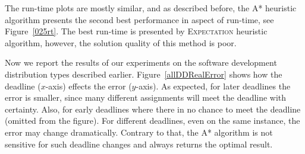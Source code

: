 \documentclass[letterpaper]{article} %
\newcommand{\commentout}[1]{}
\newcommand{\astar}{\textsc{A*}\xspace}
\newcommand{\sampling}{\textsc{Sampling}\xspace}
\newcommand{\expectation}{\textsc{Expectation}\xspace}
\begin{document}
The run-time plots are mostly similar, and as described before, the \astar heuristic algorithm presents the second best performance in aspect of run-time, see Figure~\ref{025rt}.
The best run-time is presented by \expectation heuristic algorithm, however, the solution quality of this method is poor.


\commentout{
\begin{figure}[h!]
	\scriptsize
	\begin{tikzpicture}
	\begin{axis}[
	scale=0.7,
	ymode = log,
	xlabel={\#Layers},
	ylabel near ticks,
	ylabel={Runtime (sec)},
	xmin=4, xmax=8,
	ymin=0, ymax=452,
	legend pos=outer north east,
	ymajorgrids=true,
	grid style=dashed,
	]

	\addplot[
	color=blue,
	mark=x,
	]
	coordinates {
		(4 , 0.08)
		(5 , 0.7)
		(6 , 6.16)
		(7 , 47.67)
		(8 , 452)

	};
	\addlegendentry{BF}

	\addplot[
	color=gray,
	mark=x,
	]
	coordinates {
		(4 , 0.11)
		(5 , 0.25)
		(6 , 0.8)
		(7 , 3.1)
		(8 , 16.1)

	};
	\addlegendentry{\astar}


		\addplot[
	color=green,
	mark=o,
	]
	coordinates {
		(4 , 0.13)
		(5 , 0.53)
		(6 , 2.37)
		(7 , 9)
		(8 , 43)

	};
	\addlegendentry{\sampling}

	\addplot[
	color=red,
	mark=square,
	]
	coordinates {
		(4 , 0.001)
		(5 , 0.005)
		(6 , 0.02)
		(7 , 0.09)
		(8 , 0.4)

	};
	\addlegendentry{\expectation}

	\end{axis}
	\end{tikzpicture}
	\caption{Run time comparison of all heuristic algorithms for deadline of size $0.25\cdot maxd$ and ``Failure" distribution}\label{025failrt}
\end{figure}
}


Now we report the results of our experiments on the software development distribution types described earlier.
Figure~\ref{allDDRealError} shows how the deadline ($x$-axis) effects the error ($y$-axis).
As expected, for later deadlines the error is smaller, since many different assignments will meet the deadline with certainty. Also, for early deadlines where there in no chance to meet the deadline (omitted from the figure). For different deadlines, even on the same instance, the error may change dramatically. Contrary to that, the \astar algorithm is not sensitive for such deadline changes and always returns the optimal result.
\end{document}
